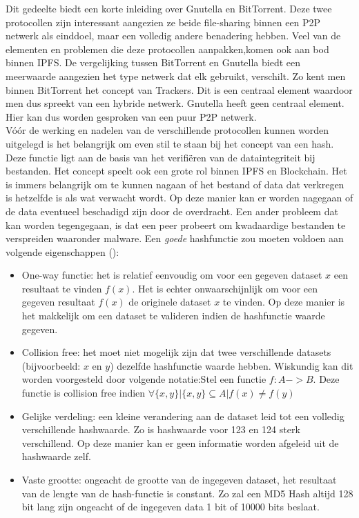 Dit gedeelte biedt een korte inleiding over Gnutella en BitTorrent. Deze twee protocollen zijn interessant aangezien ze beide file-sharing binnen een P2P netwerk als einddoel, maar een volledig andere benadering hebben. Veel van de elementen en problemen die deze protocollen aanpakken,komen ook aan bod binnen IPFS. De vergelijking tussen BitTorrent en Gnutella biedt een meerwaarde aangezien het type netwerk dat elk gebruikt, verschilt. Zo kent men binnen BitTorrent het concept van Trackers. Dit is een centraal element waardoor men dus spreekt van een hybride netwerk. Gnutella heeft geen centraal element. Hier kan dus worden gesproken van een puur P2P netwerk.\\

Vóór de werking en nadelen van de verschillende protocollen kunnen worden uitgelegd is het belangrijk om even stil te staan bij het concept van een hash. Deze functie ligt aan de basis van het verifiëren van de dataintegriteit bij bestanden. Het concept speelt ook een grote rol binnen IPFS en Blockchain. Het is immers belangrijk om te kunnen nagaan of het bestand of data dat verkregen is hetzelfde is als wat verwacht wordt. Op deze manier kan er worden nagegaan of de data eventueel beschadigd zijn door de overdracht. Een ander probleem dat kan worden tegengegaan, is dat een peer probeert om kwadaardige bestanden te verspreiden waaronder malware. Een \textit{goede} hashfunctie zou moeten voldoen aan volgende eigenschappen (\autocite{Anderson93}):

\begin{itemize}
\item One-way functie: het is relatief eenvoudig om voor een gegeven dataset $x$ een resultaat te vinden $f(x)$. Het is echter onwaarschijnlijk om voor een gegeven resultaat $f(x)$ de originele dataset $x$ te vinden. Op deze manier is het makkelijk om een dataset te valideren indien de hashfunctie waarde gegeven.\\
\item Collision free: het moet niet mogelijk zijn dat twee verschillende datasets (bijvoorbeeld: $x$ en $y$) dezelfde hashfunctie waarde hebben. Wiskundig kan dit worden voorgesteld door volgende notatie:Stel een functie $f:A->B$. Deze functie is collision free indien $\forall \{x,y\}|\{x,y\} \subseteq A | f(x) \neq f(y)$\\
\item Gelijke verdeling: een kleine verandering aan de dataset leid tot een volledig verschillende hashwaarde. Zo is hashwaarde voor 123 en 124 sterk verschillend. Op deze manier kan er geen informatie worden afgeleid uit de hashwaarde zelf.\\
\item Vaste grootte: ongeacht de grootte van de ingegeven dataset, het resultaat van de lengte van de hash-functie is constant. Zo zal een MD5 Hash altijd 128 bit lang zijn ongeacht of de ingegeven data 1 bit of 10000 bits beslaat.
\end{itemize}
 
